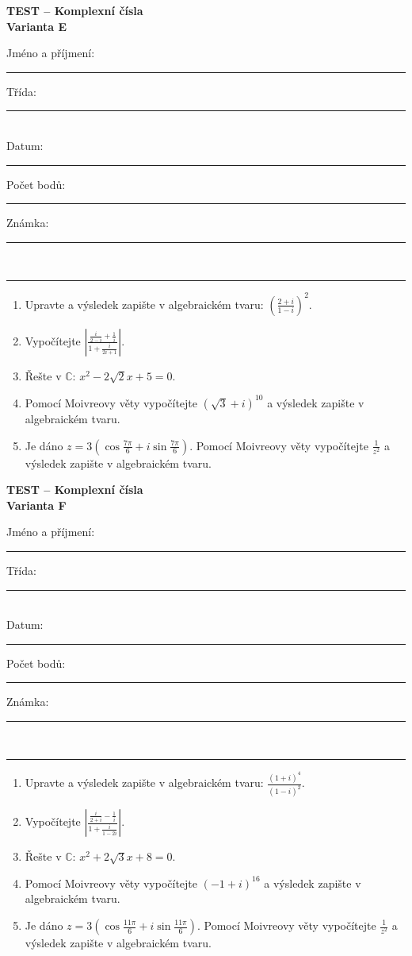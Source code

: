 \documentclass[a4paper,11pt]{article}
\newcommand{\TestTitle}{Komplexní čísla}
\newcommand{\TestHeader}[1]{%
    \begin{center}
        {\Large\bfseries TEST -- \TestTitle}\\[2mm]
        {\bfseries Varianta #1}
    \end{center}
    \vspace{2mm}
    Jméno a příjmení: \rule{9cm}{0.4pt}\hfill Třída: \rule{2cm}{0.4pt}\\[3mm]
    Datum: \rule{3cm}{0.4pt}\hfill Počet bodů: \rule{2cm}{0.4pt}\hfill Známka: \rule{2cm}{0.4pt}\\[2mm]
    \hrule\vspace{4mm}
}
\newcommand{\AnswerSpace}[1]{\vspace{#1}}
\begin{document}
\TestHeader{E}

\begin{enumerate}
    \item Upravte a výsledek zapište v algebraickém tvaru: $\displaystyle\left(\frac{2+i}{1-i}\right)^2$.
    \AnswerSpace{17mm}
    \item Vypočítejte $\displaystyle\left|\frac{\frac{i}{2-i}+\frac1i}{1+\frac{i}{2i+1}}\right|$.
    \AnswerSpace{28mm}
    \item Řešte v $\mathbb C$: $x^2-2\sqrt2x+5=0$.
    \AnswerSpace{27mm}
    \item Pomocí Moivreovy věty vypočítejte $(\sqrt3+i)^{10}$ a výsledek zapište v algebraickém tvaru.
    \AnswerSpace{30mm}
    \item Je dáno $\displaystyle z=3\left(\cos\frac{7\pi}{6}+i\sin\frac{7\pi}{6}\right)$.
    Pomocí Moivreovy věty vypočítejte $\frac1{z^2}$ a výsledek zapište v algebraickém tvaru.
    \AnswerSpace{30mm}
\end{enumerate}

\newpage
\TestHeader{F}

\begin{enumerate}
    \item Upravte a výsledek zapište v algebraickém tvaru: $\displaystyle\frac{(1+i)^4}{(1-i)^2}$.
    \AnswerSpace{17mm}
    \item Vypočítejte $\displaystyle\left|\frac{\frac{i}{2+i}-\frac1i}{1+\frac{i}{1-2i}}\right|$.
    \AnswerSpace{28mm}
    \item Řešte v $\mathbb C$: $x^2+2\sqrt3x+8=0$.
    \AnswerSpace{27mm}
    \item Pomocí Moivreovy věty vypočítejte $(-1+i)^{16}$ a výsledek zapište v algebraickém tvaru.
    \AnswerSpace{30mm}
    \item Je dáno $\displaystyle z=3\left(\cos\frac{11\pi}{6}+i\sin\frac{11\pi}{6}\right)$.
    Pomocí Moivreovy věty vypočítejte $\frac1{z^2}$ a výsledek zapište v algebraickém tvaru.
    \AnswerSpace{30mm}
\end{enumerate}
\end{document}
